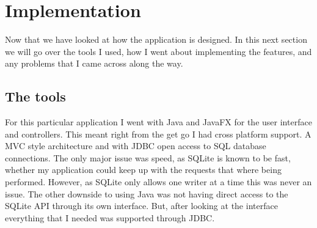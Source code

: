 %
%
%
%
%
%

\section{Implementation}
\label{sec:implementation}

Now that we have looked at how the application is designed. In this next section we will go over the tools I used, how I went about implementing the features, and any problems that I came across along the way.   

\subsection{The tools}
\label{subsec:the_tools}

For this particular application I went with Java and JavaFX for the user interface and controllers. This meant right from the get go I had cross platform support. A MVC style architecture and with JDBC open access to SQL database connections. The only major issue was speed, as SQLite is known to be fast, whether my application could keep up with the requests that where being performed. However, as SQLite only allows one writer at a time this was never an issue. The other downside to using Java was not having direct access to the SQLite API through its own interface. But, after looking at the interface everything that I needed was supported through JDBC.

